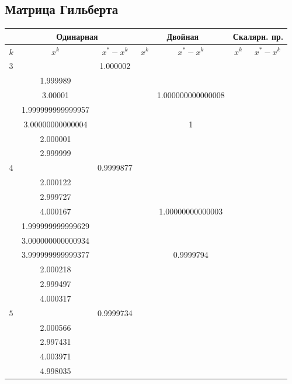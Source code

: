 \documentclass[oneside, final, 12pt]{extarticle}
\begin{document}
\subsection{Матрица Гильберта}
\begin{longtable}{|c|c|c|c|c|c|c|} \hline
	~ & \multicolumn{2}{|c|}{Одинарная} & \multicolumn{2}{|c|}{Двойная} & \multicolumn{2}{|c|}{Скалярн. пр.} \\ \hline
	\(k\) & \(x^k\) & \(x^*-x^k\) & \(x^k\) & \(x^*-x^k\) & \(x^k\) & \(x^*-x^k\) \\ \hline
	\(3\) & \( \begin{aligned}
	& 1.000002 \\ & 1.999989 \\ & 3.00001 
\end{aligned} \)
& ~ 
& \( \begin{aligned}
& 1.000000000000008 \\ & 1.999999999999957 \\ & 3.00000000000004 
\end{aligned} \)
& ~ 
& \( \begin{aligned}
& 1 \\ & 2.000001 \\ & 2.999999 
\end{aligned} \)
& ~ 
\\ \hline
\(4\) & \( \begin{aligned}
& 0.9999877 \\ & 2.000122 \\ & 2.999727 \\ & 4.000167 
\end{aligned} \)
& ~ 
& \( \begin{aligned}
& 1.00000000000003 \\ & 1.999999999999629 \\ & 3.000000000000934 \\ & 3.999999999999377 
\end{aligned} \)
& ~ 
& \( \begin{aligned}
& 0.9999794 \\ & 2.000218 \\ & 2.999497 \\ & 4.000317 
\end{aligned} \)
& ~ 
\\ \hline
\(5\) & \( \begin{aligned}
& 0.9999734 \\ & 2.000566 \\ & 2.997431 \\ & 4.003971 \\ & 4.998035 

\end{aligned}
\end{longtable}
\end{document}

